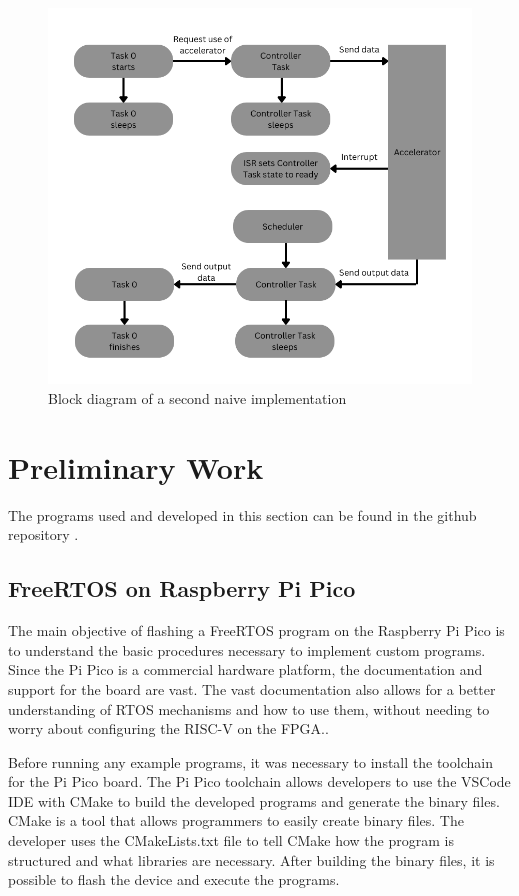 \begin{figure}[H]
    \centering
    \includegraphics[scale=0.55]{Figures/sol2.png}
    \caption{Block diagram of a second naive implementation}
    \label{fig:sol2}
\end{figure}

\section{Preliminary Work}
The programs used and developed in this section can be found in the github repository \cite{gitrepo}.


\subsection{FreeRTOS on Raspberry Pi Pico}
The main objective of flashing a FreeRTOS program on the Raspberry Pi Pico is to understand the basic procedures necessary to implement custom programs. Since the Pi Pico is a commercial hardware platform, the documentation and support for the board are vast. The vast documentation also allows for a better understanding of RTOS mechanisms and how to use them, without needing to worry about configuring the RISC-V on the FPGA..

Before running any example programs, it was necessary to install the toolchain for the Pi Pico board. The Pi Pico toolchain allows developers to use the VSCode IDE with CMake to build the developed programs and generate the binary files. CMake is a tool that allows programmers to easily create binary files. The developer uses the CMakeLists.txt file to tell CMake how the program is structured and what libraries are necessary. After building the binary files, it is possible to flash the device and execute the programs.


